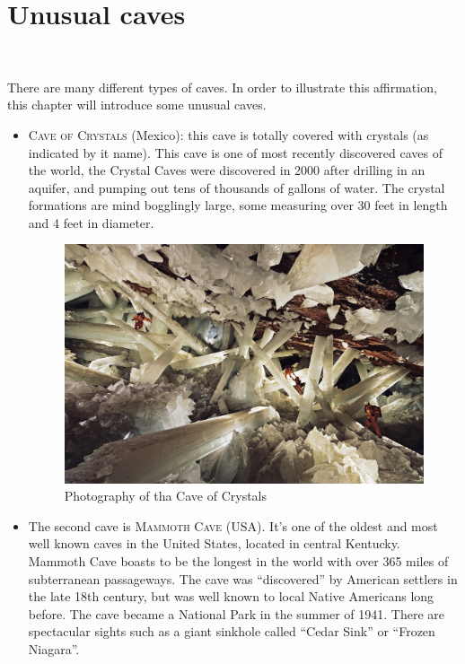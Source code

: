 \documentclass[draft, final]{report}
\begin{document}
\section{Unusual caves}
~\par
There are many different types of caves. In order to illustrate this affirmation, this chapter will introduce some unusual caves.\\
\begin{itemize}
  \item \textsc{Cave of Crystals} (Mexico): this cave is totally covered with crystals (as indicated by it name). This cave is one of most recently discovered caves of the world, the Crystal Caves were discovered in 2000 after drilling in an aquifer, and pumping out tens of thousands of gallons of water. The crystal formations are mind bogglingly large, some measuring over 30 feet in length and 4 feet in diameter.
  \begin{figure}[!ht]
    \centering
    \includegraphics[scale=0.15]{LateX/Images/crystalcave.jpg}
    \caption{Photography of tha Cave of Crystals\cite{naicacave}}
  \end{figure}
  \item The second cave is \textsc{Mammoth Cave} (USA). It's one of the oldest and most well known caves in the United States, located in central Kentucky. Mammoth Cave boasts to be the longest in the world with over 365 miles of subterranean passageways. The cave was “discovered” by American settlers in the late 18th century, but was well known to local Native Americans long before. The cave became a National Park in the summer of 1941. There are spectacular sights such as a giant sinkhole called “Cedar Sink” or “Frozen Niagara”.
  \begin{figure}[!ht]

\end{figure}
\end{itemize}
\end{document}
